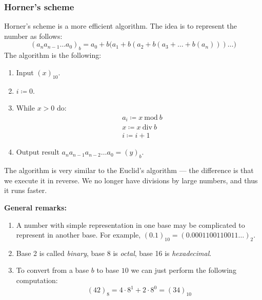 \subsubsection{Horner's scheme}
Horner's scheme is a more efficient algorithm. The idea is to represent
the number as follows:
\[
    (a_n a_{n - 1} \dots a_{0})_b = 
    a_0 + b\bigl(a_1 + b(a_2 + b(a_3 + \dots + b (a_n))) \dots \bigr)
\]
The algorithm is the following:
\begin{enumerate}
    \item {
        Input $(x)_{10}$.
    }
    \item {
        $i \coloneqq 0$.
    }
    \item {
        While $x > 0$ do:
        \begin{align*}
            &
            a_i \coloneqq x \ \mathrm{mod}\ b
            \\&
            x \coloneqq x \ \mathrm{div}\ b
            \\&
            i \coloneqq i + 1
        \end{align*}
    }
    \item {
        Output result $a_n a_{n-1} a_{n-2} \dots a_0 = (y)_b$.
    }
\end{enumerate}
\begin{remark}
    The algorithm is very similar to the Euclid's algorithm ---
    the difference is that we execute it in reverse. 
    We no longer have divisions by large numbers, and thus
    it runs faster.
\end{remark}

\textbf{General remarks:}
\begin{enumerate}
    \item {
        A number with simple representation in one base 
        may be complicated to represent in another base.
        For example,
        $(0.1)_{10} = (0.0001100110011\dots)_2$.
    }
    \item {
        Base 2 is called \textit{binary},
        base 8 is \textit{octal},
        base 16 is \textit{hexadecimal}.
    }
    \item {
        To convert from a base $b$
        to base $10$ we can just perform the following computation:
        \[
            (42)_8 = 4 \cdot 8^1 + 2 \cdot 8^0 = (34)_{10}
        \]
    }
\end{enumerate}